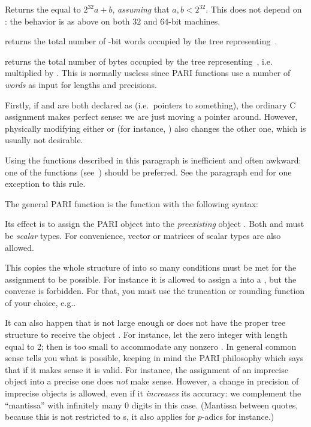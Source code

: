
Returns the  equal to $2^{32} a + b$, \emph{assuming} that
$a,b < 2^{32}$. This does not depend on : the behavior is
as above on both $32$ and $64$-bit machines.


 returns the total number of \B-bit words occupied
by the tree representing~.

 returns the total number of bytes occupied
by the tree representing~, i.e.~ multiplied by
. This is normally useless since PARI functions use
a number of \emph{words} as input for lengths and precisions.

Firstly, if  and  are both declared as  (i.e.~pointers
to something), the ordinary C assignment  makes perfect sense: we
are just moving a pointer around. However, physically modifying either
 or  (for instance, ) also changes the other
one, which is usually not desirable. \label{se:assign}

 Using the functions described in this
paragraph is inefficient and often awkward: one of the 
functions (see~) should be preferred. See the paragraph
end for one exception to this rule.

\noindent
The general PARI  function is the function  with
the following syntax:


\noindent
Its effect is to assign the PARI object  into the \emph{preexisting}
object . Both  and  must be \emph{scalar} types. For
convenience, vector or matrices of scalar types are also allowed.

This copies the whole structure of  into  so many conditions
must be met for the assignment to be possible. For instance it is allowed to
assign a  into a , but the converse is forbidden. For
that, you must use the truncation or rounding function of your choice,
e.g..

It can also happen that  is not large enough or does not have the proper
tree structure to receive the object . For instance, let  the zero
integer with length equal to 2; then  is too small to accommodate any
nonzero . In general common sense tells you what is possible,
keeping in mind the PARI philosophy which says that if it makes sense it is
valid. For instance, the assignment of an imprecise object into a precise one
does \emph{not} make sense. However, a change in precision of imprecise
objects is allowed, even if it \emph{increases} its accuracy: we complement
the ``mantissa'' with infinitely many $0$ digits in this case. (Mantissa
between quotes, because this is not restricted to s, it also
applies for $p$-adics for instance.)

